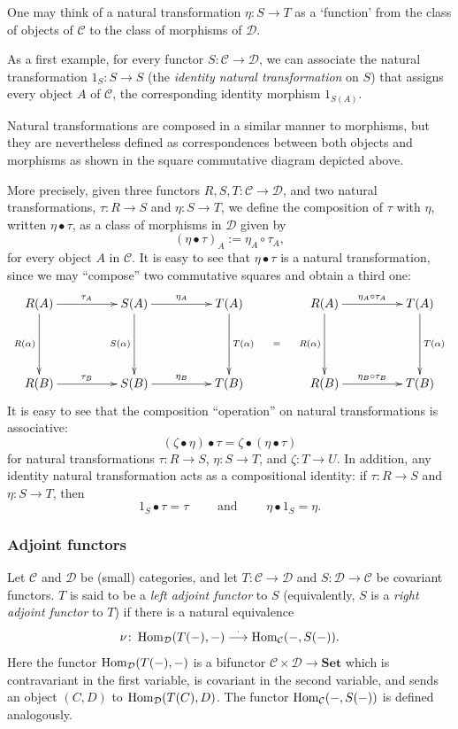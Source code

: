 \documentclass[10pt]{article}
\theoremstyle{plain}
\theoremstyle{definition}
\theoremstyle{remark}
\def\Hom{\mathop{\rm Hom}\nolimits}
\begin{document}
One may think of a natural transformation $\eta:S\to T$ as a `function' from the class of objects of $\mathcal{C}$ to the class of morphisms of $\mathcal{D}$.

As a first example, for every functor $S:\mathcal{C}\to \mathcal{D}$, we can associate the natural transformation $1_S: S\to S$ (the \emph{identity natural transformation} on $S$) that assigns every object $A$ of $\mathcal{C}$, the corresponding identity morphism $1_{S(A)}$.

Natural transformations are composed in a similar manner to morphisms, but they are nevertheless defined as correspondences between both objects and morphisms as shown in the square commutative diagram depicted above.

More precisely, given three functors $R,S,T:\mathcal{C}\to \mathcal{D}$, and two natural transformations, $\tau:R\to S$ and $\eta:S\to T$, we define the composition of $\tau$ with $\eta$, written $\eta \bullet \tau$, as a class of morphisms in $\mathcal{D}$ given by
$$(\eta\bullet \tau)_A := \eta_A\circ \tau_A,$$ for every object $A$ in $\mathcal{C}$.
It is easy to see that $\eta\bullet \tau$ is a natural transformation, since we may ``compose'' two commutative squares and obtain a third one:
$$
\xymatrix@+=4pc{R(A) \ar[d]_{R(\alpha)} \ar[r]^{\tau_A}  & S(A) \ar[d]_{S(\alpha)} \ar[r]^{\eta_A} & T(A) \ar[d]^{T(\alpha)} \ar@{}[dr]|{=} &
R(A) \ar[d]_{R(\alpha)} \ar[r]^{\eta_A \circ \tau_A} & T(A) \ar[d]^{T(\alpha)}
\\
R(B) \ar[r]^{\tau_{B}} & S(B) \ar[r]^{\eta_{B}} & T(B) &
R(B) \ar[r]^{\eta_B \circ \tau_B} & T(B)
}
$$
It is easy to see that the composition ``operation'' on natural transformations is associative:
$$(\zeta\bullet \eta)\bullet \tau = \zeta\bullet (\eta \bullet \tau)$$
for natural transformations $\tau:R\to S$, $\eta:S\to T$, and $\zeta:T\to U$.  In addition, any identity natural transformation acts as a compositional identity: if $\tau:R\to S$ and $\eta:S\to T$, then $$1_S\bullet \tau=\tau \qquad\mbox{ and }\qquad \eta \bullet 1_S = \eta.$$

\subsubsection{Adjoint functors}
Let $\mathcal{C}$ and $\mathcal{D}$ be (small) categories, and let $T:\mathcal{C} \to \mathcal{D}$ and $S:\mathcal{D} \to \mathcal{C}$ be covariant functors. $T$ is said to be a \emph{left adjoint functor} to $S$ (equivalently, $S$ is a \emph{right adjoint functor} to $T$) if there is a natural equivalence
\[
\nu\colon \Hom_{\mathcal{D}}(T(-),-) \overset{\cdot}{\longrightarrow} \Hom_{\mathcal{C}}(-,S(-)).
\]
Here the functor $\Hom_{\mathcal{D}}(T(-),-)$ is a bifunctor $\mathcal{C}\times\mathcal{D}\to\mathbf{Set}$ which is contravariant in the first variable, is covariant in the second variable, and sends an object $(C,D)$ to $\Hom_{\mathcal{D}}(T(C),D)$.  The functor $\Hom_{\mathcal{C}}(-,S(-))$ is defined analogously.
\end{document}

